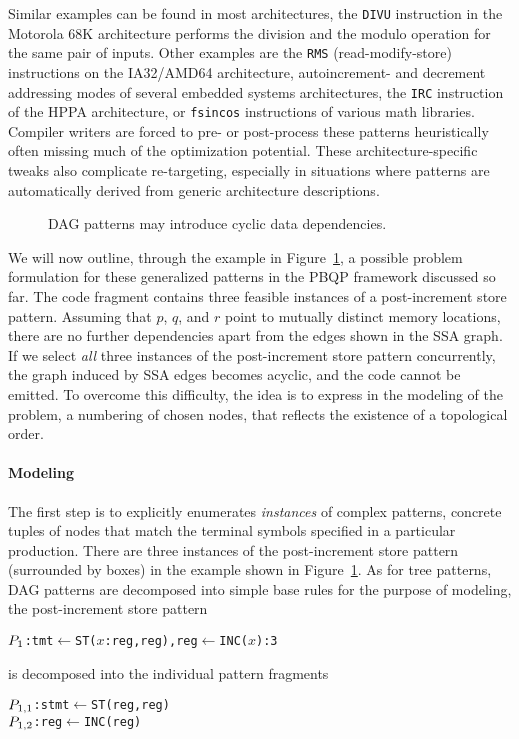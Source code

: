 Similar examples can be found in most architectures, \eg the
\texttt{DIVU} instruction in the Motorola 68K architecture performs
the division and the modulo operation for the same pair of
inputs. Other examples are the \texttt{RMS} (read-modify-store)
instructions on the IA32/AMD64 architecture, autoincrement- and
decrement addressing modes of several embedded systems architectures,
the \texttt{IRC} instruction of the HPPA architecture, or
\texttt{fsincos} instructions of various math libraries. Compiler
writers are forced to pre- or post-process these patterns
heuristically often missing much of the optimization potential. 
These architecture-specific tweaks also complicate
re-targeting, especially in situations where patterns are
automatically derived from generic architecture descriptions.


\begin{figure}[t]
  \centering
  \caption{DAG patterns may introduce cyclic data dependencies.}\label{fig:topology}
\end{figure}

We will now outline, through the example in
Figure~\ref{fig:topology}, a possible problem formulation for these
generalized patterns in the PBQP framework discussed so far. 
The code fragment contains three feasible instances of a post-increment
store pattern. Assuming that $p$, $q$, and $r$ point to mutually
distinct memory locations, there are no further dependencies apart
from the edges shown in the SSA graph. If we select \emph{all } three
instances of the post-increment store pattern concurrently, the graph induced by SSA edges becomes acyclic, and the code cannot be emitted. To overcome this difficulty, the idea is to express in the modeling of the problem, a numbering of chosen nodes, that reflects the existence of a topological order. 


\paragraph{Modeling}
The first step is to explicitly enumerates \emph{instances\/} of complex
patterns, \ie
concrete tuples of nodes that match the terminal symbols specified in
a particular production. There are three instances of the
post-increment store pattern (surrounded by boxes) in the example shown
in Figure~\ref{fig:topology}.
As for tree patterns, DAG patterns are decomposed into simple base
rules for the purpose of modeling, \eg the post-increment store
pattern
\begin{alltt}
  \(P\sb{1}\): tmt \(\gets\) ST(\(x\):reg, reg), reg \(\gets\) INC(\(x\)) : 3
\end{alltt}
is decomposed into the individual pattern fragments
\begin{alltt}
  \(P\sb{1,1}\): stmt \(\gets\) ST(reg, reg)
  \(P\sb{1,2}\): reg  \(\gets\) INC(reg)
\end{alltt}

